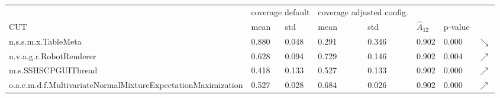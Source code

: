\begin{tabular}{l|ll|ll|lll}
\hline
                                                             & \multicolumn{2}{l|}{coverage default} & \multicolumn{2}{l|}{coverage adjusted config.} &                &         &           \\
CUT                                                          & mean               & std               & mean              & std               & $\hat{A}_{12}$ & p-value &           \\ \hline
n.s.s.m.x.TableMeta                                          & 0.880              & 0.048             & 0.291             & 0.346             & 0.902          & 0.000   & $\searrow$ \\
n.v.a.g.r.RobotRenderer                                      & 0.628              & 0.094             & 0.729             & 0.146             & 0.902          & 0.004   & $\nearrow$ \\
m.s.SSHSCPGUIThread                                          & 0.418              & 0.133             & 0.527             & 0.133             & 0.902          & 0.000   & $\nearrow$ \\
o.a.c.m.d.f.MultivariateNormalMixtureExpectationMaximization & 0.527              & 0.028             & 0.684             & 0.026             & 0.902          & 0.000   & $\nearrow$ \\ \hline
\end{tabular}